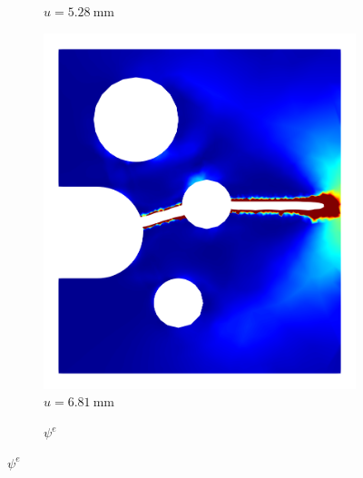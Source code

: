 \begin{figure}[!htb]
\begin{subfigure}{0.17\textwidth}
    \caption{$u = \SI{5.28}{\milli\meter}$}
    \label{fig: Chapter5/SFC/We_2}
  \end{subfigure}
  \hspace{0.03\textwidth}
  \begin{subfigure}{0.17\textwidth}
    \centering
    \includegraphics[width=\textwidth,scale=0.5]{Chapter5/figures/SFC/E_el_3}
    \caption{$u = \SI{6.81}{\milli\meter}$}
    \label{fig: Chapter5/SFC/We_3}
  \end{subfigure}
  \begin{subfigure}{0.04\textwidth}
    \centering
    \caption*{$\psi^e$}

\end{subfigure}
\end{figure}
